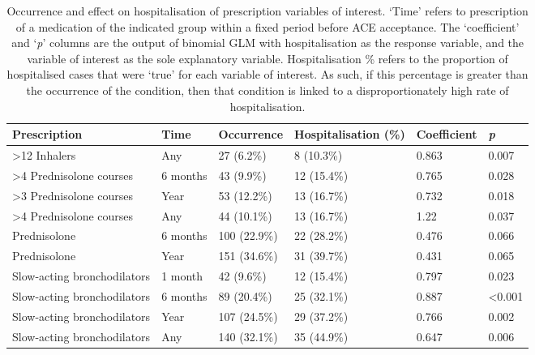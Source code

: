\begin{table}[H]
   \caption[Occurrence and effect on hospitalisation of prescription variables of interest]{Occurrence and effect on hospitalisation of prescription variables of interest. `Time' refers to prescription of a medication of the indicated group within a fixed period before ACE acceptance. The `coefficient' and `\textit{p}' columns are the output of binomial GLM with hospitalisation as the response variable, and the variable of interest as the sole explanatory variable. Hospitalisation \% refers to the proportion of hospitalised cases that were `true' for each variable of interest. As such, if this percentage is greater than the occurrence of the condition, then that condition is linked to a disproportionately high rate of hospitalisation.}
       \centering
\begin{tabular}{P{2.8cm}P{1.65cm}P{2.25cm}P{2.25cm}P{1.75cm}P{1cm}}
  \hline
Prescription & Time & Occurrence & Hospitalisation (\%) & Coefficient & \textit{p}\\ 
  \hline
  \textgreater 12 Inhalers & Any & 27 (6.2\%) & 8 (10.3\%) & 0.863 & 0.007\\ 
  \textgreater 4 Prednisolone courses & 6 months & 43 (9.9\%) & 12 (15.4\%) & 0.765 & 0.028 \\ 
  \textgreater 3 Prednisolone courses & Year & 53 (12.2\%) & 13 (16.7\%) & 0.732 & 0.018 \\ 
  \textgreater 4 Prednisolone courses & Any  & 44 (10.1\%) & 13 (16.7\%) & 1.22 & 0.037\\ 
  Prednisolone & 6 months & 100 (22.9\%) & 22 (28.2\%) &  0.476 & 0.066\\ 
  Prednisolone & Year & 151 (34.6\%) & 31 (39.7\%) & 0.431 & 0.065 \\ 
  Slow-acting bronchodilators & 1 month & 42 (9.6\%) & 12 (15.4\%) & 0.797 & 0.023\\ 
  Slow-acting bronchodilators & 6 months & 89 (20.4\%) & 25 (32.1\%) & 0.887 & <0.001 \\ 
  Slow-acting bronchodilators & Year & 107 (24.5\%) & 29 (37.2\%) & 0.766 & 0.002 \\ 
  Slow-acting bronchodilators & Any & 140 (32.1\%) & 35 (44.9\%) & 0.647 & 0.006 \\ 
   \hline
\end{tabular}\label{tab:additional-prescriptions-interest}
\end{table}

